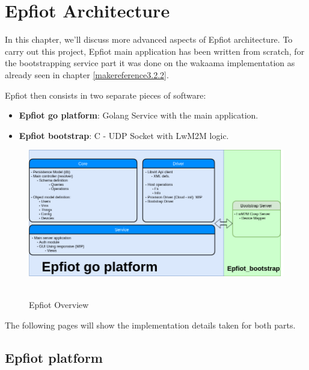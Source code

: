 
\cleardoublepage

\chapter{Epfiot Architecture}
\label{makereference4}

In this chapter, we'll discuss more advanced aspects of Epfiot architecture. To carry out this project, Epfiot main application has been written from scratch, for the bootstrapping service part it was done on the wakaama implementation as already seen in chapter \ref{makereference3.2.2}.

Epfiot then consists in two separate pieces of software:
\begin{itemize}
    \item \textbf{Epfiot go platform}: Golang Service with the main application.
    \item \textbf{Epfiot bootstrap}:  C - UDP Socket with LwM2M logic.
\end{itemize}

\begin{figure}[h!]%
\centering
    \includegraphics[width=5.5in]{figures/Application.png}
~\caption{Epfiot Overview}
\label{figure4.1}
\end{figure}
The following pages will show the implementation details taken for both parts.



\section{Epfiot platform}
\label{makereference4.2}

